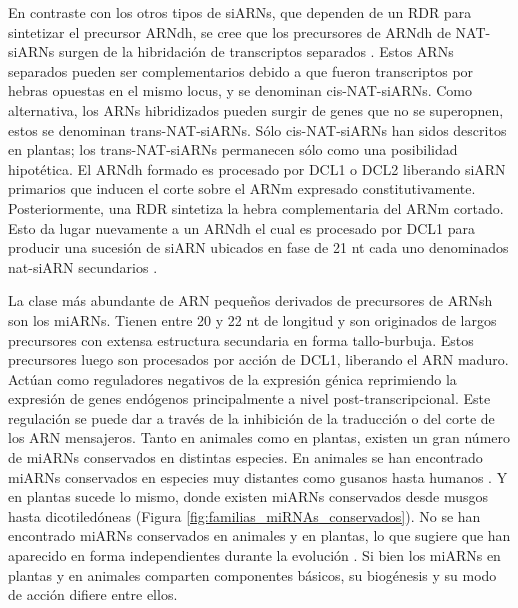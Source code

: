 En contraste con los otros tipos de siARNs, que dependen de un RDR para sintetizar el precursor ARNdh, se cree que los precursores de ARNdh de NAT-siARNs surgen de la hibridación de transcriptos separados \citep{pmid16377568,pmid17071740}.
Estos ARNs separados pueden ser complementarios debido a que fueron transcriptos por hebras opuestas en el mismo locus, y se denominan cis-NAT-siARNs.
Como alternativa, los ARNs hibridizados pueden surgir de genes que no se superopnen, estos se denominan trans-NAT-siARNs.
Sólo cis-NAT-siARNs han sidos descritos en plantas; los trans-NAT-siARNs permanecen sólo como una posibilidad hipotética.
El ARNdh formado es procesado por DCL1 o DCL2 liberando siARN primarios que inducen el corte sobre el ARNm expresado constitutivamente.
Posteriormente, una RDR sintetiza la hebra complementaria del ARNm cortado. 
Esto da lugar nuevamente a un ARNdh el cual es procesado por DCL1 para producir una sucesión de siARN ubicados en fase de 21 nt cada uno denominados nat-siARN secundarios \citep{pmid16377568,pmid17071740}.

La clase más abundante de ARN pequeños derivados de precursores de ARNsh son los miARNs.
Tienen entre 20 y 22 nt de longitud y son originados de largos precursores con extensa estructura secundaria en forma tallo-burbuja.
Estos precursores luego son procesados por acción de DCL1, liberando el ARN maduro. 
Actúan como reguladores negativos de la expresión génica reprimiendo la expresión de genes endógenos principalmente a nivel post-transcripcional.
Este regulación se puede dar a través de la inhibición de la traducción o del corte de los ARN mensajeros.
Tanto en animales como en plantas, existen un gran número de miARNs conservados en distintas especies.
En animales se han encontrado miARNs conservados en especies muy distantes como gusanos hasta humanos \citep{pmid11081512}.
Y en plantas sucede lo mismo, donde existen miARNs conservados desde musgos hasta dicotiledóneas \citep{pmid15849273,Axtell2008343,citeulike:8816489} (Figura \ref{fig:familias_miRNAs_conservados}).
No se han encontrado miARNs conservados en animales y en plantas, lo que sugiere que han aparecido en forma independientes durante la evolución \citep{citeulike:8816489}.
Si bien los miARNs en plantas y en animales comparten componentes básicos, su biogénesis y su modo de acción difiere entre ellos.


